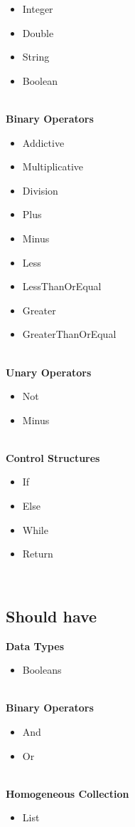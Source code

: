 \begin{itemize} 
    \item Integer
    \item Double
    \item String
    \item Boolean
\end{itemize} 
\\
\textbf{Binary Operators} \\
\begin{itemize} 
    \item Addictive
    \item Multiplicative
    \item Division
    \item Plus
    \item Minus
    \item Less
    \item LessThanOrEqual
    \item Greater
    \item GreaterThanOrEqual
\end{itemize} 
\\
\textbf{Unary Operators} \\
\begin{itemize} 
    \item Not
    \item Minus
\end{itemize}
\\
\textbf{Control Structures} \\
\begin{itemize} 
    \item If
    \item Else
    \item While
    \item Return
\end{itemize} 
\\
\subsection{Should have }
\textbf{Data Types }
\begin{itemize} 
    \item Booleans
\end{itemize} 
\\
\textbf{Binary Operators} 
\begin{itemize} 
    \item And
    \item Or
\end{itemize} 
\\
\textbf{Homogeneous Collection }
\begin{itemize} 
    \item List
\end{itemize} 
\\
